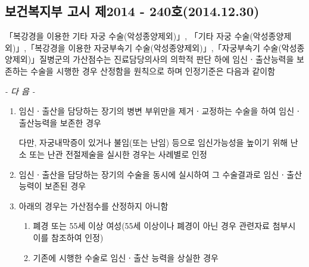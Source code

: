 \clearpage		
\subsection{보건복지부 고시 제2014 - 240호(2014.12.30)}
「복강경을 이용한 기타 자궁 수술(악성종양제외)」, 「기타 자궁 수술(악성종양제외)」,「복강경을 이용한 자궁부속기 수술(악성종양제외)」,「자궁부속기 수술(악성종양제외)」질병군의 가산점수는 진료담당의사의 의학적 판단 하에 임신ㆍ출산능력을 보존하는 수술을 시행한 경우 산정함을 원칙으로 하며 인정기준은 다음과 같이함\par
\begin{center}\emph{- 다 음 -}\end{center}
\begin{enumerate}[가.]\tightlist
\item 임신ㆍ출산을 담당하는 장기의 병변 부위만을 제거ㆍ교정하는 수술을 하여 임신ㆍ출산능력을 보존한 경우\par
다만, 자궁내막증이 있거나 불임(또는 난임) 등으로 임신가능성을 높이기 위해 난소 또는 난관 전절제술을 실시한 경우는 사례별로 인정
\item 임신ㆍ출산을 담당하는 장기의 수술을 동시에 실시하여 그 수술결과로 임신ㆍ출산능력이 보존된 경우
\item 아래의 경우는 가산점수를 산정하지 아니함
	\begin{enumerate}[(1)]\tightlist
	\item 폐경 또는 55세 이상 여성(55세 이상이나 폐경이 아닌 경우 관련자료 첨부시 이를 참조하여 인정)
	\item 기존에 시행한 수술로 임신ㆍ출산 능력을 상실한 경우
	\end{enumerate}
\end{enumerate}

